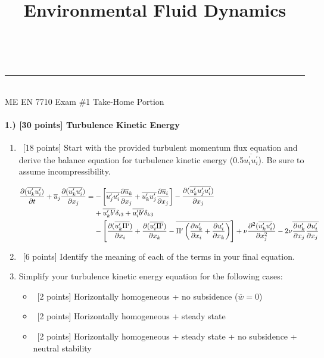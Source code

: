 \documentclass[11pt]{article}
\makeatletter
\newcommand{\linia}{\rule{\linewidth}{0.5pt}}
\renewcommand{\maketitle}{
\begin{center}
\vspace{2ex}
{\huge \textsc{\@title}}
\vspace{1ex}
\\
\linia\\
ME EN 7710 \hfill Exam \#1 \hfill Take-Home Portion
\vspace{4ex}
\end{center}
}
\makeatother
\begin{document}
\title{Environmental Fluid Dynamics}

\maketitle

\paragraph{1.) [30 points] Turbulence Kinetic Energy}
\begin{enumerate}[label=\alph*.)]
	
\item ~[18 points] Start with the provided turbulent momentum flux equation and derive the balance equation for turbulence kinetic energy (0.5$\overline{u_i^\prime u_i^\prime}$). Be sure to assume incompressibility.

\begin{align*}
\frac{\partial (\overline{u_k^\prime u_i^\prime})}{\partial t} + \overline u_j \frac{\partial (\overline{u_k^\prime u_i^\prime})}{\partial x_j} &= -\left[\overline{u_j^\prime u_i^\prime}\frac{\partial \overline u_k}{\partial x_j} + \overline{u_k^\prime u_j^\prime}\frac{\partial \overline u_i}{\partial x_j}\right] - \frac{\partial (\overline{u_k^\prime u_j^\prime u_i^\prime})}{\partial x_j} \\&\hphantom{=\ }+ \overline{u_k^\prime b^\prime}\delta_{i3} + \overline{u_i^\prime b^\prime}\delta_{k3}\\&\hphantom{=\ }-\left[ \frac{\partial(\overline{u_k^\prime \Pi^\prime})}{\partial x_i} + \frac{\partial(\overline{u_i^\prime \Pi^\prime})}{\partial x_k}- \overline{\Pi^\prime \left(\frac{\partial u_k^\prime}{\partial x_i} + \frac{\partial u_i^\prime}{\partial x_k}\right)}\right] +\nu \frac{\partial^2 (\overline{u_k^\prime u_i^\prime})}{\partial x_j^2} - 2\nu \overline{\frac{\partial u_k^\prime}{\partial x_j}\frac{\partial u_i^\prime}{\partial x_j}}
\end{align*}

\item ~[6 points] Identify the meaning of each of the terms in your final equation.
\item Simplify your turbulence kinetic energy equation for the following cases:
	\begin{itemize}
		\item ~[2 points] Horizontally homogeneous + no subsidence ($\overline{w}=0$)
		\item ~[2 points] Horizontally homogeneous + steady state
		\item ~[2 points] Horizontally homogeneous + steady state + no subsidence + neutral stability
	\end{itemize}
\end{enumerate}
\end{document}
